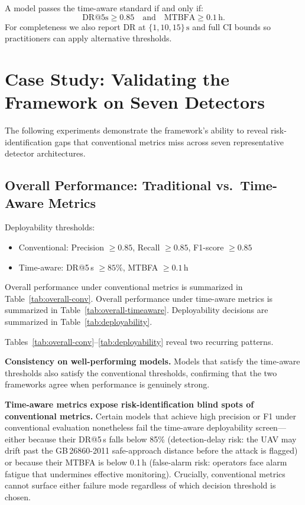 \documentclass{ieeeaccess}
\begin{document}
A model passes the time-aware standard if and only if:
\begin{equation}
  \text{DR@5s} \geq 0.85 \quad \text{and} \quad \text{MTBFA} \geq 0.1\,\text{h}.
\end{equation}
For completeness we also report DR at $\{1,10,15\}\,\text{s}$ and
full CI bounds so practitioners can apply alternative thresholds.

\section{Case Study: Validating the Framework on Seven Detectors}
\label{sec:casestudy}

The following experiments demonstrate the framework's ability to reveal
risk-identification gaps that conventional metrics miss across seven representative
detector architectures.

\subsection{Overall Performance: Traditional vs.\ Time-Aware Metrics}

Deployability thresholds:

\begin{itemize}
\item Conventional: Precision $\ge 0.85$, Recall $\ge 0.85$, F1-score $\ge 0.85$
\item Time-aware: DR@5\,s $\ge 85\%$, MTBFA $\ge 0.1\,\mathrm{h}$
\end{itemize}

Overall performance under conventional metrics is summarized in Table~\ref{tab:overall-conv}. Overall performance under time-aware metrics is summarized in Table~\ref{tab:overall-timeaware}. Deployability decisions are summarized in Table~\ref{tab:deployability}.








Tables~\ref{tab:overall-conv}--\ref{tab:deployability} reveal two recurring patterns.

\textbf{Consistency on well-performing models.}
Models that satisfy the time-aware thresholds also satisfy the conventional thresholds,
confirming that the two frameworks agree when performance is genuinely strong.

\textbf{Time-aware metrics expose risk-identification blind spots of conventional metrics.}
Certain models that achieve high precision or F1 under conventional evaluation
nonetheless fail the time-aware deployability screen---either because their DR@5\,s
falls below 85\% (detection-delay risk: the UAV may drift past the GB\,26860-2011
safe-approach distance before the attack is flagged) or because their MTBFA is below
0.1\,h (false-alarm risk: operators face alarm fatigue that undermines effective monitoring).
Crucially, conventional metrics cannot surface either failure mode regardless of which
decision threshold is chosen.
\end{document}
